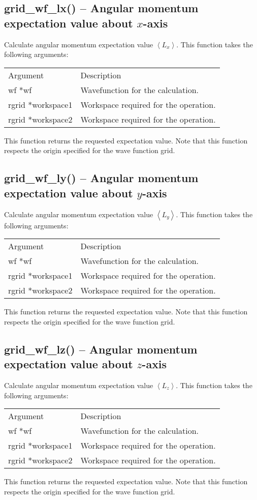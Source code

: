 \documentclass[12pt,letterpaper]{report}
\begin{document}
\subsection{grid\_wf\_lx() -- Angular momentum expectation value about $x$-axis}

Calculate angular momentum expectation value $\left<L_x\right>$. This function takes the following arguments:
\begin{longtable}{p{} p{}}
Argument & Description\\
\cline{1-2}
wf *wf & Wavefunction for the calculation.\\
rgrid *workspace1 & Workspace required for the operation.\\
rgrid *workspace2 & Workspace required for the operation.\\
\end{longtable}
\noindent
This function returns the requested expectation value. Note that this function respects the origin specified for the wave function grid.

\subsection{grid\_wf\_ly() -- Angular momentum expectation value about $y$-axis}

Calculate angular momentum expectation value $\left<L_y\right>$. This function takes the following arguments:
\begin{longtable}{p{} p{}}
Argument & Description\\
\cline{1-2}
wf *wf & Wavefunction for the calculation.\\
rgrid *workspace1 & Workspace required for the operation.\\
rgrid *workspace2 & Workspace required for the operation.\\
\end{longtable}
\noindent
This function returns the requested expectation value. Note that this function respects the origin specified for the wave function grid.

\subsection{grid\_wf\_lz() -- Angular momentum expectation value about $z$-axis}

Calculate angular momentum expectation value $\left<L_z\right>$. This function takes the following arguments:
\begin{longtable}{p{} p{}}
Argument & Description\\
\cline{1-2}
wf *wf & Wavefunction for the calculation.\\
rgrid *workspace1 & Workspace required for the operation.\\
rgrid *workspace2 & Workspace required for the operation.\\
\end{longtable}
\noindent
This function returns the requested expectation value. Note that this function respects the origin specified for the wave function grid.
\end{document}
